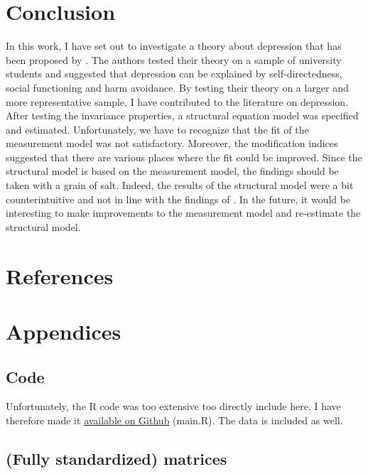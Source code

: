 \documentclass[11pt]{article}
\begin{document}
\FloatBarrier\pagebreak\section{Conclusion}

In this work, I have set out to investigate a theory about depression that has
been proposed by \textcite{tse2011}. The authors tested their theory on a sample
of university students and suggested that depression can be explained by
self-directedness, social functioning and harm avoidance. By testing their
theory on a larger and more representative sample, I have contributed to the
literature on depression. After testing the invariance properties, a structural
equation model was specified and estimated. Unfortunately, we have to recognize
that the fit of the measurement model was not satisfactory. Moreover, the
modification indices suggested that there are various places where the fit
could be improved. Since the structural model is based on the measurement model,
the findings should be taken with a grain of salt. Indeed, the results of the
structural model were a bit counterintuitive and not in line with the findings
of \textcite{tse2011}. In the future, it would be interesting to make
improvements to the measurement model and re-estimate the structural model.

\FloatBarrier\pagebreak\section{References}
\printbibliography[heading=none]

\FloatBarrier\pagebreak\section{Appendices}
\subsection{Code}

Unfortunately, the R code was too extensive too directly include here. I have
therefore made it \href{https://github.com/vandenbroecksebastiaan/SEM/}{available on Github}
(main.R). The data is included as well.

\subsection{(Fully standardized) matrices}
\end{document}
